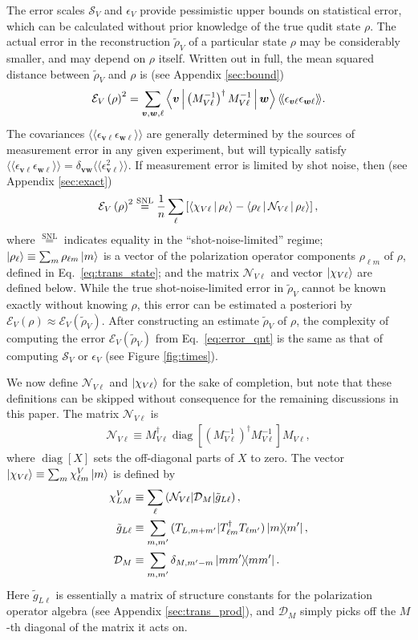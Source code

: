 \documentclass[a4paper,twocolumn,unpublished]{quantumarticle}
\renewcommand{\t}{\text} %
\newcommand{\f}[2]{\dfrac{#1}{#2}} %
\newcommand{\p}[1]{\left(#1\right)} %
\renewcommand{\sp}[1]{\left[#1\right]} %
\newcommand{\bk}{\Braket} %
\newcommand{\bbk}[1]{\langle\!\langle #1 \rangle\!\rangle}
\newcommand{\D}{\mathcal{D}}
\newcommand{\E}{\mathcal{E}}
\newcommand{\N}{\mathcal{N}}
\renewcommand{\S}{\mathcal{S}}
\def\obk#1{\mathinner{({#1})}}
\DeclareMathOperator{\diag}{diag}
\begin{document}
The error scales $\S_V$ and $\epsilon_V$ provide pessimistic upper bounds on statistical error, which can be calculated without prior knowledge of the true qudit state $\rho$.
The actual error in the reconstruction $\tilde\rho_V$ of a particular state $\rho$ may be considerably smaller, and may depend on $\rho$ itself.
Written out in full, the mean squared distance between $\tilde\rho_V$ and $\rho$ is (see Appendix \ref{sec:bound})
\begin{align}
  \E_V\p{\rho}^2 = \sum_{\bm v,\bm w,\ell}
  \bk{\bm v|\p{M_{V\ell}^{-1}}^\dag M_{V\ell}^{-1}|\bm w}
  \bbk{\epsilon_{\bm v\ell}\epsilon_{\bm w\ell}}.
  \label{eq:error_cls}
\end{align}
The covariances $\bbk{\epsilon_{\bm v\ell}\epsilon_{\bm w\ell}}$ are generally determined by the sources of measurement error in any given experiment, but will typically satisfy $\bbk{\epsilon_{\bm v\ell}\epsilon_{\bm w\ell}} = \delta_{\bm v\bm w}\bbk{\epsilon_{\bm v\ell}^2}$.
If measurement error is limited by shot noise, then (see Appendix \ref{sec:exact})
\begin{align}
  \E_V\p{\rho}^2 \stackrel{\t{SNL}}{=} \f1n \sum_\ell
  \sp{\bk{\chi_{V\ell}|\rho_\ell}
    - \bk{\rho_\ell|\N_{V\ell}|\rho_\ell}},
  \label{eq:error_qnt}
\end{align}
where $\stackrel{\t{SNL}}{=}$ indicates equality in the ``shot-noise-limited'' regime; $\ket{\rho_\ell} \equiv \sum_m \rho_{\ell m}\ket{m}$ is a vector of the polarization operator components $\rho_{\ell m}$ of $\rho$, defined in Eq.~\eqref{eq:trans_state}; and the matrix $\N_{V\ell}$ and vector $\ket{\chi_{V\ell}}$ are defined below.
While the true shot-noise-limited error in $\tilde\rho_V$ cannot be known exactly without knowing $\rho$, this error can be estimated a posteriori by $\E_V\p{\rho}\approx\E_V\p{\tilde\rho_V}$.
After constructing an estimate $\tilde\rho_V$ of $\rho$, the complexity of computing the error $\E_V\p{\tilde\rho_V}$ from Eq.~\eqref{eq:error_qnt} is the same as that of computing $\S_V$ or $\epsilon_V$ (see Figure \ref{fig:times}).

We now define $\N_{V\ell}$ and $\ket{\chi_{V\ell}}$ for the sake of completion, but note that these definitions can be skipped without consequence for the remaining discussions in this paper.
The matrix $\N_{V\ell}$ is
\begin{align}
  \N_{V\ell} \equiv M_{V\ell}^\dag
  \diag\sp{\p{M_{V\ell}^{-1}}^\dag M_{V\ell}^{-1}} M_{V\ell},
\end{align}
where $\diag\sp{X}$ sets the off-diagonal parts of $X$ to zero.
The vector $\ket{\chi_{V\ell}}\equiv\sum_m \chi^V_{\ell m} \ket{m}$ is defined by
\begin{align}
  \chi^V_{LM} &\equiv
  \sum_\ell \obk{\N_{V\ell}|\D_M|\tilde g_{L\ell}}, \\
  \tilde g_{L\ell} &\equiv \sum_{m,m'}
  \obk{T_{L,m+m'}|T_{\ell m}^\dag T_{\ell m'}} \op{m}{m'}, \\
  \D_M &\equiv \sum_{m,m'} \delta_{M,m'-m} \op{mm'}.
\end{align}
Here $\tilde g_{L\ell}$ is essentially a matrix of structure constants for the polarization operator algebra (see Appendix \ref{sec:trans_prod}), and $\D_M$ simply picks off the $M$-th diagonal of the matrix it acts on.
\end{document}

